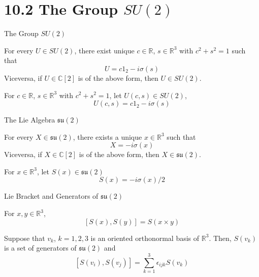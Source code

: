 \section{10.2 The Group $SU(2)$}

\begin{frame}{The Group $SU(2)$}
    \begin{proposition}[10.2.1]
        For every $U \in SU(2)$, there exist unique $c \in \mathbb{R}$, $s \in \mathbb{R}^3$ with $c^2 + s^2 = 1$ such that
        \[ U = c1_2 - i\sigma(s) \]
        Viceversa, if $U \in \mathbb{C}[2]$ is of the above form, then $U \in SU(2)$.
    \end{proposition}

    \begin{definition}[10.2.1]
        For $c \in \mathbb{R}$, $s \in \mathbb{R}^3$ with $c^2 + s^2 = 1$, let $U(c,s) \in SU(2)$,
        \[ U(c,s) = c1_2 - i\sigma(s) \]
    \end{definition}
\end{frame}

\begin{frame}{The Lie Algebra $\mathfrak{su}(2)$}
    \begin{proposition}[10.2.2]
        For every $X \in \mathfrak{su}(2)$, there exists a unique $x \in \mathbb{R}^3$ such that
        \[ X = -i\sigma(x) \]
        Viceversa, if $X \in \mathbb{C}[2]$ is of the above form, then $X \in \mathfrak{su}(2)$.
    \end{proposition}

    \begin{definition}[10.2.2]
        For $x \in \mathbb{R}^3$, let $S(x) \in \mathfrak{su}(2)$
        \[ S(x) = -i\sigma(x)/2 \]
    \end{definition}
\end{frame}

\begin{frame}{Lie Bracket and Generators of $\mathfrak{su}(2)$}
    \begin{proposition}[10.2.3]
        For $x, y \in \mathbb{R}^3$,
        \[ [S(x), S(y)] = S(x \times y) \]
    \end{proposition}

    \begin{proposition}[10.2.4]
        Suppose that $v_k$, $k=1,2,3$ is an oriented orthonormal basis of $\mathbb{R}^3$. Then, $S(v_k)$ is a set of generators of $\mathfrak{su}(2)$ and
        \[ [S(v_i), S(v_j)] = \sum_{k=1}^3 \epsilon_{ijk}S(v_k) \]
    \end{proposition}
\end{frame}

